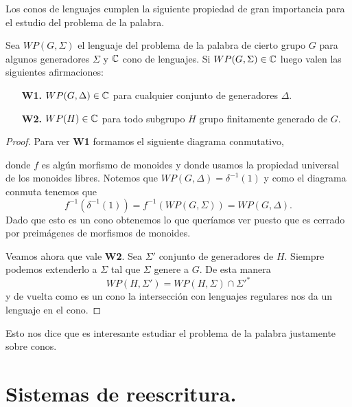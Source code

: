 \documentclass[tesis.tex]{subfiles}
\newcommand{\fg}{grupo finitamente generado }
\begin{document}
Los conos de lenguajes cumplen la siguiente propiedad de gran importancia para el estudio del problema de la palabra.
\medskip
\begin{prop}\label{prop-cono-wp}
	Sea $WP(G, \Sigma)$ el lenguaje del problema de la palabra de cierto grupo $G$ para algunos generadores $\Sigma$ y $\mathbb{C}$ cono de lenguajes. 
	Si $WP(G, \Sigma) \in \mathbb{C}$ luego valen las siguientes afirmaciones:
	\begin{itemize}
		\item[\textbf{W1.}] $WP(G, \Delta) \in \mathbb{C}$ para cualquier conjunto de generadores $\Delta$.
		\item[\textbf{W2.}] $WP(H) \in \mathbb{C}$ para todo subgrupo $H$ \fg de $G$.
	\end{itemize} 
\end{prop}
\begin{proof}
	
		Para ver \textbf{W1} formamos el siguiente diagrama conmutativo,
		\begin{center}
		\end{center}
		donde $f$ es algún morfismo de monoides y donde usamos la propiedad universal de los monoides libres.
		Notemos que $WP(G, \Delta) = \delta^{-1}(1)$ y como el diagrama conmuta tenemos que 
		\[
		f^{-1}(\delta^{-1}(1)) = f^{-1}(WP(G,\Sigma)) = WP(G, \Delta).
		\]
		Dado que esto es un cono obtenemos lo que queríamos ver puesto que es cerrado por preimágenes de morfismos de monoides.
		
		
		
		Veamos ahora que vale \textbf{W2}. 
		Sea $\Sigma'$ conjunto de generadores de $H$.
		Siempre podemos extenderlo a $\Sigma$ tal que $\Sigma$ genere a $G$. 
		De esta manera 
		\[
		WP(H, \Sigma') = WP(H, \Sigma) \cap \Sigma'^*
		\]
		y de vuelta como es un cono la intersección con lenguajes regulares nos da un lenguaje en el cono. 

\end{proof}
\medskip
Esto nos dice que es interesante estudiar el problema de la palabra justamente sobre conos.


\section{Sistemas de reescritura.}
\end{document}
